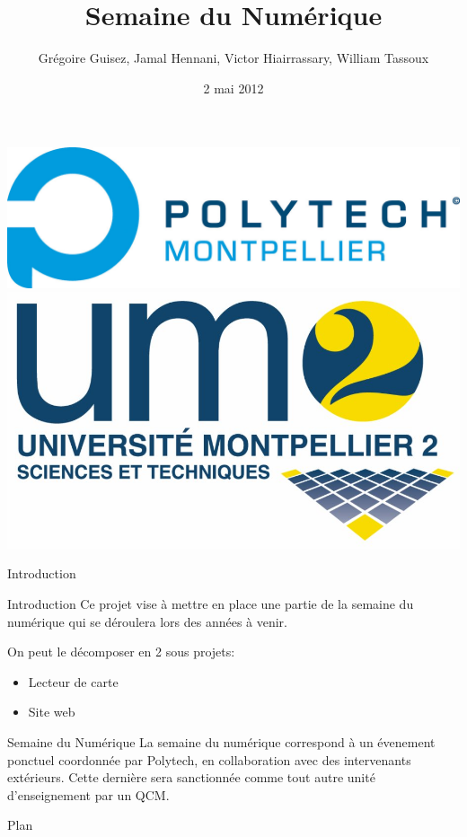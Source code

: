\documentclass[handout]{beamer}
\title{Semaine du Numérique}
\author[G. Guisez, J. Hennani, V. Hiairrassary, W. Tassoux]{Grégoire Guisez, Jamal Hennani, Victor Hiairrassary, William Tassoux}
\institute{Polytech' Montpellier, Université Montpellier 2}
\date{2 mai 2012}
\begin{document}
\small 



\begin{frame}
    \titlepage

    \includegraphics[scale=0.2]{images/logoPolytech.jpg}
    \includegraphics[scale=0.05]{images/logoUm2.jpg}
    \vfill
    \rlap{\hskip0.1cm}
    \vskip8pt
\end{frame}


\begin{frame}{Introduction}
    \begin{block}{Introduction}
 		 Ce projet vise à mettre en place une partie de la semaine du numérique qui se déroulera lors des années à venir.

		 On peut le décomposer en 2 sous projets:
		\begin{itemize}
			\item Lecteur de carte
			\item Site web
		\end{itemize}
	\end{block}

	\begin{block}{Semaine du Numérique}
	    La semaine du numérique correspond à un évenement ponctuel coordonnée 
    par Polytech, en collaboration avec des intervenants extérieurs. Cette 
    dernière sera sanctionnée comme tout autre unité d'enseignement par un QCM.
	\end{block}	
\end{frame}


\begin{frame}{Plan}
 	\tableofcontents
\end{frame}




\end{document}
